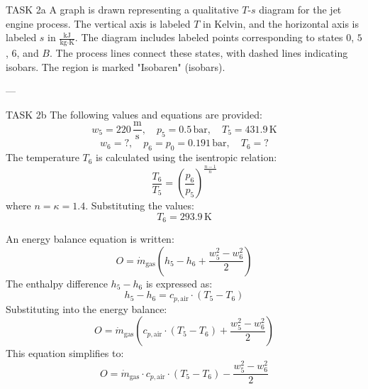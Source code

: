 TASK 2a  
A graph is drawn representing a qualitative \( T \)-\( s \) diagram for the jet engine process. The vertical axis is labeled \( T \) in Kelvin, and the horizontal axis is labeled \( s \) in \( \frac{\text{kJ}}{\text{kg·K}} \). The diagram includes labeled points corresponding to states \( 0 \), \( 5 \), \( 6 \), and \( B \). The process lines connect these states, with dashed lines indicating isobars. The region is marked "Isobaren" (isobars).  

---

TASK 2b  
The following values and equations are provided:  
\[
w_5 = 220 \, \frac{\text{m}}{\text{s}}, \quad p_5 = 0.5 \, \text{bar}, \quad T_5 = 431.9 \, \text{K}
\]  
\[
w_6 = ?, \quad p_6 = p_0 = 0.191 \, \text{bar}, \quad T_6 = ?
\]  
The temperature \( T_6 \) is calculated using the isentropic relation:  
\[
\frac{T_6}{T_5} = \left( \frac{p_6}{p_5} \right)^{\frac{n-1}{n}}
\]  
where \( n = \kappa = 1.4 \). Substituting the values:  
\[
T_6 = 293.9 \, \text{K}
\]  

An energy balance equation is written:  
\[
O = \dot{m}_{\text{gas}} \left( h_5 - h_6 + \frac{w_5^2 - w_6^2}{2} \right)
\]  
The enthalpy difference \( h_5 - h_6 \) is expressed as:  
\[
h_5 - h_6 = c_{p,\text{air}} \cdot \left( T_5 - T_6 \right)
\]  
Substituting into the energy balance:  
\[
O = \dot{m}_{\text{gas}} \left( c_{p,\text{air}} \cdot \left( T_5 - T_6 \right) + \frac{w_5^2 - w_6^2}{2} \right)
\]  
This equation simplifies to:  
\[
O = \dot{m}_{\text{gas}} \cdot c_{p,\text{air}} \cdot \left( T_5 - T_6 \right) - \frac{w_5^2 - w_6^2}{2}
\]